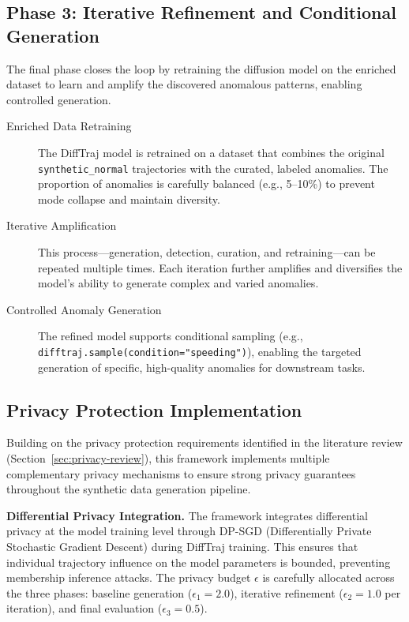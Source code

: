 \subsection{Phase 3: Iterative Refinement and Conditional Generation}
\label{sec:iterative-refinement}

The final phase closes the loop by retraining the diffusion model on the enriched dataset to learn and amplify the discovered anomalous patterns, enabling controlled generation.

\begin{description}
  \item[Enriched Data Retraining] The DiffTraj model is retrained on a dataset that combines the original \texttt{synthetic\_normal} trajectories with the curated, labeled anomalies. The proportion of anomalies is carefully balanced (e.g., 5--10\%) to prevent mode collapse and maintain diversity.
  \item[Iterative Amplification] This process---generation, detection, curation, and retraining---can be repeated multiple times. Each iteration further amplifies and diversifies the model's ability to generate complex and varied anomalies.
  \item[Controlled Anomaly Generation] The refined model supports conditional sampling (e.g., \texttt{difftraj.sample(condition="speeding")}), enabling the targeted generation of specific, high-quality anomalies for downstream tasks.
\end{description}

\subsection{Privacy Protection Implementation}
\label{sec:privacy-implementation}

Building on the privacy protection requirements identified in the literature review (Section~\ref{sec:privacy-review}), this framework implements multiple complementary privacy mechanisms to ensure strong privacy guarantees throughout the synthetic data generation pipeline.

\textbf{Differential Privacy Integration.} The framework integrates differential privacy at the model training level through DP-SGD (Differentially Private Stochastic Gradient Descent) during DiffTraj training. This ensures that individual trajectory influence on the model parameters is bounded, preventing membership inference attacks. The privacy budget $\epsilon$ is carefully allocated across the three phases: baseline generation ($\epsilon_1 = 2.0$), iterative refinement ($\epsilon_2 = 1.0$ per iteration), and final evaluation ($\epsilon_3 = 0.5$).

